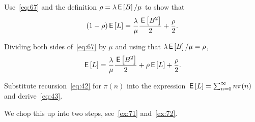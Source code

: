 \documentclass[companion]{subfiles}
\begin{document}
\begin{extra}
 Use~\cref{eq:67} and the definition $\rho=\lambda \,\mathsf{E}\left[B\right]/\mu$ to show that
\begin{equation*}
(1- \rho) \,\mathsf{E}\left[L\right] = \frac{\lambda}\mu \frac{\,\mathsf{E}\left[B^2\right]}2 + \frac\rho2.
\end{equation*}
\begin{solution}
 Dividing both sides of~\cref{eq:67} by $\mu$ and using that $\lambda \,\mathsf{E}\left[B\right]/\mu = \rho$,
\begin{equation*}
 \,\mathsf{E}\left[L\right] = \frac{\lambda}{\mu} \frac{\,\mathsf{E}\left[B^2\right]}2 + \rho \,\mathsf{E}\left[L\right] + \frac\rho2.
\end{equation*}
\end{solution}
\end{extra}

\begin{exercise}
 Substitute recursion~\cref{eq:42} for $\pi(n)$ into the expression $\,\mathsf{E}\left[L\right] = \sum_{n=0}^\infty n \pi(n)$ and derive~\cref{eq:43}.
\begin{solution}
 We chop this up into two steps, see~\cref{ex:71} and~\cref{ex:72}.
\end{solution}
\end{exercise}
\end{document}
